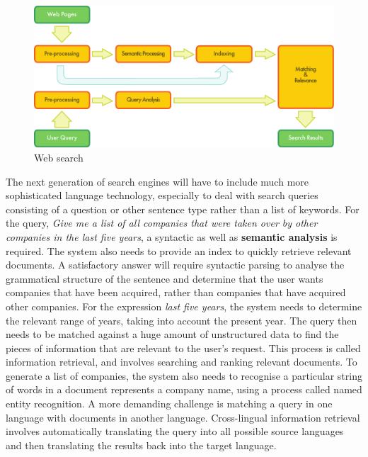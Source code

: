 \begin{multicols}{2}
\begin{figure}[htb]
  \center
  \includegraphics[width=\textwidth]{../_media/english/web_search_architecture}
  \caption{Web search}
  \label{fig:websearcharch_en}
 \end{figure}


The next generation of search engines will have to include much more sophisticated language technology, especially to deal with search queries consisting of a question or other sentence type rather than a list of keywords. For the query, \textit{Give me a list of all companies that were taken over by other companies in the last five years}, a syntactic as well as \textbf{semantic analysis} is required. The system also needs to provide an index to quickly retrieve relevant documents. A satisfactory answer will require syntactic parsing to analyse the grammatical structure of the sentence and determine that the user wants companies that have been acquired, rather than companies that have acquired other companies. For the expression \textit{last five years}, the system needs to determine the relevant range of years, taking into account the present year. The query then needs to be matched against a huge amount of unstructured data to find the pieces of information that are relevant to the user’s request. This process is called information retrieval, and involves searching and ranking relevant documents. To generate a list of companies, the system also needs to recognise a particular string of words in a document represents a company name, using a process called named entity recognition. A more demanding challenge is matching a query in one language with documents in another language. Cross-lingual information retrieval involves automatically translating the query into all possible source languages and then translating the results back into the target language. 


\end{multicols}

